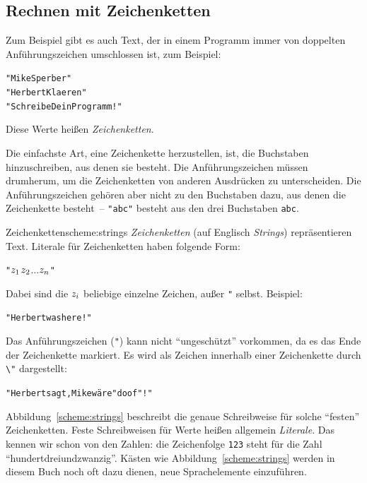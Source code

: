\subsection{Rechnen mit Zeichenketten}

Zum Beispiel gibt es auch Text, der in einem Programm immer von
doppelten Anführungszeichen umschlossen ist, zum Beispiel:
%
\begin{alltt}
"Mike Sperber"
"Herbert Klaeren"
"Schreibe Dein Programm!"
\end{alltt}
%
Diese Werte heißen \textit{Zeichenketten}.

Die einfachste Art, eine Zeichenkette herzustellen, ist, die
Buchstaben hinzuschreiben, aus denen sie besteht.  Die
Anführungszeichen müssen drumherum, um die Zeichenketten von anderen
Ausdrücken zu unterscheiden.  Die Anführungszeichen gehören aber nicht
zu den Buchstaben dazu, aus denen die Zeichenkette besteht~--
\verb|"abc"| besteht aus den drei Buchstaben \texttt{abc}.

\begin{feature}{Zeichenketten}{scheme:strings}
\textit{Zeichenketten} (auf Englisch
\textit{Strings}) repräsentieren Text.
Literale für Zeichenketten haben folgende Form:
%
\begin{alltt}
"\(z\sb{1}\)\(z\sb{2}\) \(\ldots\) \(z\sb{n}\)"
\end{alltt}
%
Dabei sind die \(z\sb{i}\) beliebige einzelne Zeichen, außer \verb|"| selbst.
Beispiel:
%
\begin{alltt}
"Herbert was here!"
\end{alltt}
%
Das Anführungszeichen (\verb|"|) kann nicht "`ungeschützt"' vorkommen, da es das Ende der
Zeichenkette markiert. Es wird als Zeichen innerhalb einer Zeichenkette
durch \verb|\"| dargestellt:
%
\begin{alltt}
"Herbert sagt, Mike wäre \backwhack{}"doof\backwhack{}"!"
\end{alltt}
\end{feature}

Abbildung~\ref{scheme:strings} beschreibt die genaue Schreibweise für
solche "`festen"' Zeichenketten.  Feste Schreibweisen für Werte heißen
allgemein \textit{Literale}.  Das kennen wir schon von
den Zahlen: die Zeichenfolge \texttt{123} steht für die Zahl
"`hundertdreiundzwanzig"'.  Kästen wie Abbildung~\ref{scheme:strings}
werden in diesem Buch noch oft dazu dienen, neue Sprachelemente
einzuführen.

